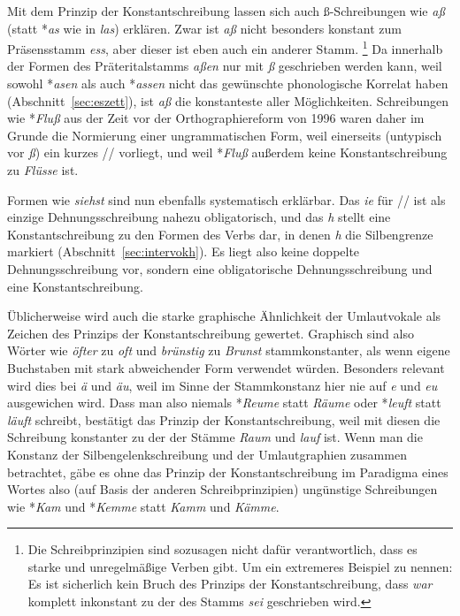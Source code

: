Mit dem Prinzip der Konstantschreibung lassen sich auch ß-Schreibungen wie \textit{aß} (statt *\textit{as} wie in \textit{las}) erklären.
Zwar ist \textit{aß} nicht besonders konstant zum Präsensstamm \textit{ess}, aber dieser ist eben auch ein anderer Stamm.%
\footnote{Die Schreibprinzipien sind sozusagen nicht dafür verantwortlich, dass es starke und unregelmäßige Verben gibt.
Um ein extremeres Beispiel zu nennen:
Es ist sicherlich kein Bruch des Prinzips der Konstantschreibung, dass \textit{war} komplett inkonstant zu der des Stamms \textit{sei} geschrieben wird.}
Da innerhalb der Formen des Präteritalstamms \textit{aßen} nur mit \textit{ß} geschrieben werden kann, weil sowohl *\textit{asen} als auch *\textit{assen} nicht das gewünschte phonologische Korrelat haben (Abschnitt~\ref{sec:eszett}), ist \textit{aß} die konstanteste aller Möglichkeiten.
Schreibungen wie *\textit{Fluß} aus der Zeit vor der Orthographiereform von 1996 waren daher im Grunde die Normierung einer ungrammatischen Form, weil einerseits (untypisch vor \textit{ß}) ein kurzes // vorliegt, und weil *\textit{Fluß} außerdem keine Konstantschreibung zu \textit{Flüsse} ist.

Formen wie \textit{siehst} sind nun ebenfalls systematisch erklärbar.
Das \textit{ie} für // ist als einzige Dehnungsschreibung nahezu obligatorisch, und das \textit{h} stellt eine Konstantschreibung zu den Formen des Verbs dar, in denen \textit{h} die Silbengrenze markiert (Abschnitt~\ref{sec:intervokh}).
Es liegt also keine doppelte Dehnungsschreibung vor, sondern eine obligatorische Dehnungsschreibung und eine Konstantschreibung.

Üblicherweise wird auch die starke graphische Ähnlichkeit der Umlautvokale als Zeichen des Prinzips der Konstantschreibung gewertet.
Graphisch sind also Wörter wie \textit{öfter} zu \textit{oft} und \textit{brünstig} zu \textit{Brunst} stammkonstanter, als wenn eigene Buchstaben mit stark abweichender Form verwendet würden.
Besonders relevant wird dies bei \textit{ä} und \textit{äu}, weil im Sinne der Stammkonstanz hier nie auf \textit{e} und \textit{eu} ausgewichen wird.
Dass man also niemals *\textit{Reume} statt \textit{Räume} oder *\textit{leuft} statt \textit{läuft} schreibt, bestätigt das Prinzip der Konstantschreibung, weil mit diesen die Schreibung konstanter zu der der Stämme \textit{Raum} und \textit{lauf} ist.
Wenn man die Konstanz der Silbengelenkschreibung und der Umlautgraphien zusammen betrachtet, gäbe es ohne das Prinzip der Konstantschreibung im Paradigma eines Wortes also (auf Basis der anderen Schreibprinzipien) ungünstige Schreibungen wie *\textit{Kam} und *\textit{Kemme} statt \textit{Kamm} und \textit{Kämme}.

